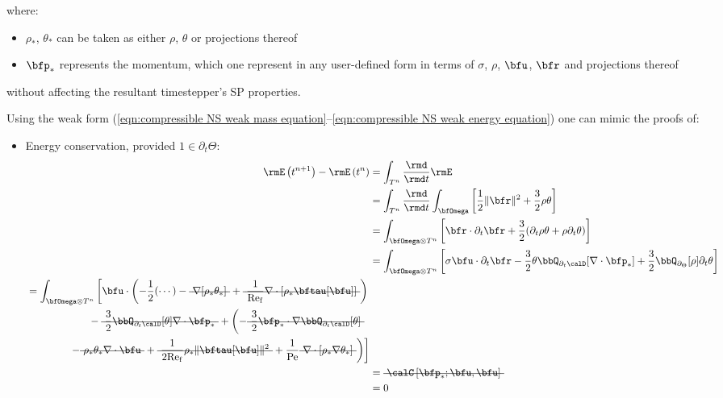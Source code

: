     where:
    \begin{itemize}
        \item  $\rho_{*}$, $\theta_{*}$ can be taken as either $\rho$, $\theta$ or projections thereof
        \item  $\bfp_{*}$ represents the momentum, which one represent in any user-defined form in terms of $\sigma$, $\rho$, $\bfu$, $\bfr$ and projections thereof
    \end{itemize}
    without affecting the resultant timestepper's SP properties.

    \line

    Using the weak form (\ref{eqn:compressible NS weak mass equation}--\ref{eqn:compressible NS weak energy equation}) one can mimic the proofs of:
    \begin{itemize}
        \item  Energy conservation, provided $1 \in \partial_{t}\Theta$:
        \begin{align}
                \rmE\left(t^{n + 1}\right) - \rmE\left(t^{n}\right)
                &=  \int_{T^{n}}\frac{\rmd}{\rmd t}\rmE  \\
                &=  \int_{T^{n}}\frac{\rmd}{\rmd t}\int_{\bfOmega}\left[\frac{1}{2}\|\bfr\|^{2} + \frac{3}{2}\rho\theta\right]  \\
                &=  \int_{\bfOmega\otimes T^{n}}\left[\bfr\cdot\partial_{t}\bfr + \frac{3}{2}(\partial_{t}\rho\theta + \rho\partial_{t}\theta)\right]  \\
                &=  \int_{\bfOmega\otimes T^{n}}\left[\sigma\bfu\cdot\partial_{t}\bfr - \frac{3}{2}\theta\bbQ_{\partial_{t}\calD}[\nabla\cdot\bfp_{*}] + \frac{3}{2}\bbQ_{\partial_{\Theta}}[\rho]\partial_{t}\theta\right]  \\
            \begin{split}
                &=  \int_{\bfOmega\otimes T^{n}}\left[\bfu\cdot\left(- \frac{1}{2}(\cdots) - \mst{\nabla[\rho_{*}\theta_{*}]} + \mst{\frac{1}{\rmRef}\nabla\cdot[\rho_{*}\bftau[\bfu]]}\right)\right.  \\
                &\qquad\qquad\qquad- \mst{\frac{3}{2}\bbQ_{\partial_{t}\calD}[\theta]\nabla\cdot\bfp_{*}} + \left(- \mst{\frac{3}{2}\bfp_{*}\cdot\nabla\bbQ_{\partial_{t}\calD}[\theta]}\right.  \\
                &\qquad\qquad\left.\left.- \mst{\rho_{*}\theta_{*}\nabla\cdot\bfu} + \mst{\frac{1}{2\rmRef}\rho_{*}\|\bftau[\bfu]\|^{2}} + \frac{1}{\rmPe}\mst{\nabla\cdot[\rho_{*}\nabla\theta_{*}]}\right)\right]
            \end{split}  \\
                &=  \mst{\calC\left[\bfp_{*}; \bfu, \bfu\right]}  \\
                &=  0
        \end{align}


\end{itemize}
